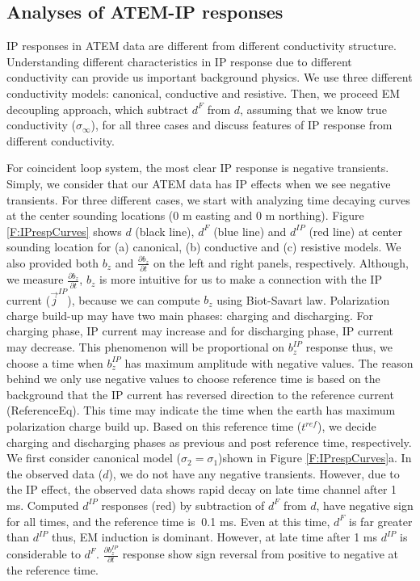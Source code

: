 \documentclass[a4paper, 11pt]{article}
\newcommand{\siginf}{\sigma_\infty}
\renewcommand {\j}  { {\vec j} }
\newcommand{\dip}{d^{IP}}
\begin{document}
\subsection{Analyses of ATEM-IP responses}
IP responses in ATEM data are different from different conductivity structure. Understanding different characteristics in IP response due to different conductivity can provide us important background physics. We use three different conductivity models: canonical, conductive and resistive. Then,  we proceed EM decoupling approach, which subtract $d^F$ from $d$,  assuming that we know true conductivity ($\siginf$), for all three cases and discuss features of IP response from different conductivity. 

For coincident loop system, the most clear IP response is negative transients. Simply, we consider that our ATEM data has IP effects when we see negative transients. For three different cases, we start with analyzing time decaying curves at the center sounding locations (0 m easting and 0 m northing). Figure \ref{F:IPrespCurves} shows $d$ (black line), $d^{F}$ (blue line) and $\dip$ (red line) at center sounding location for (a) canonical, (b) conductive and (c) resistive models. We also provided both $b_z$ and $\frac{\partial b_z}{\partial t}$ on the left and right panels, respectively. Although, we measure $\frac{\partial b_z}{\partial t}$, $b_z$ is more intuitive for us to make a connection with the IP current ($\j^{IP}$), because we can compute $b_z$ using Biot-Savart law. Polarization charge build-up may have two main phases: charging and discharging. For charging phase, IP current may increase and for discharging phase, IP current may decrease. This phenomenon will be proportional on $b^{IP}_z$ response thus, we choose a time when $b^{IP}_z$ has maximum amplitude with negative values. The reason behind we only use negative values to choose reference time is based on the background that the IP current has reversed direction to the reference current (ReferenceEq). This time may indicate the time when the earth has maximum polarization charge build up. Based on this reference time ($t^{ref}$), we decide charging and discharging phases as previous and post reference time, respectively.   We first consider canonical model ($\sigma_2 = \sigma_1$)shown in Figure \ref{F:IPrespCurves}a. In the observed data ($d$), we do not have any negative transients. However, due to the IP effect, the observed data shows rapid decay on late time channel after 1 ms. Computed $\dip$ responses (red) by subtraction of $d^F$ from $d$, have negative sign for all times, and the reference time is $~$0.1 ms. Even at this time, $d^{F}$ is far greater than $\dip$ thus, EM induction is dominant. However, at late time after 1 ms $\dip$ is considerable to $d^{F}$. $\frac{\partial b^{IP}_z}{\partial t}$ response show sign reversal from positive to negative at the reference time.
\end{document}
